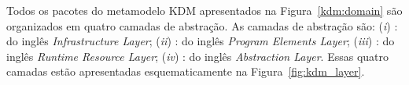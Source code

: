 Todos os pacotes do metamodelo KDM apresentados na Figura~\ref{kdm:domain} são organizados em quatro camadas de abstração. As camadas de abstração são: (\textit{i}) : do inglês \textit{Infrastructure Layer}; (\textit{ii}) : do inglês \textit{Program Elements Layer}; (\textit{iii}) : do inglês \textit{Runtime Resource Layer}; (\textit{iv}) : do inglês \textit{Abstraction Layer}. Essas quatro camadas estão apresentadas esquematicamente na Figura~\ref{fig:kdm_layer}.





